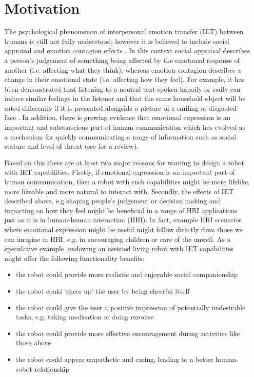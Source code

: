 \documentclass[11pt]{article}
\begin{document}
\section{Motivation}
The psychological phenomenon of interpersonal emotion transfer (IET) between humans is still not fully understood; however it is believed to include social appraisal and emotion contagion effects \cite{parkinson2011interpersonal}. In this context social appraisal describes a person's judgement of something being affected by the emotional response of another (i.e. affecting what they think), whereas emotion contagion describes a change in their emotional state (i.e. affecting how they feel). For example, it has been demonstrated that listening to a neutral text spoken happily or sadly can induce similar feelings in the listener \cite{neumann2000mood} and that the same household object will be rated differently if it is presented alongside a picture of a smiling or disgusted face \cite{bayliss2007affective}. In addition, there is growing evidence that emotional expression is an important and subconscious part of human communication which has evolved as a mechanism for quickly communicating a range of information such as social stature and level of threat (see \cite{tracy2015nonverbal} for a review). 

Based on this there are at least two major reasons for wanting to design a robot with IET capabilities. Firstly, if emotional expression is an important part of human communication, then a robot with such capabilities might be more lifelike, more likeable and more natural to interact with. Secondly, the effects of IET described above, e.g shaping people's judgement or decision making and impacting on how they feel might be beneficial in a range of HRI applications just as it is in human-human interaction (HHI). In fact, example HRI scenarios where emotional expression might be useful might follow directly from those we can imagine in HHI, e.g. in encouraging children or care of the unwell. As a speculative example, endowing an assisted living robot with IET  capabilities might offer the following functionality benefits: 
\begin{itemize}
\item the robot could provide more realistic and enjoyable social companionship
\item the robot could `cheer up' the user by being cheerful itself
\item the robot could give the user a positive impression of potentially undesirable tasks, e.g. taking medication or doing exercise
\item the robot could provide more effective encouragement during activities like those above
\item the robot could appear empathetic and caring, leading to a better human-robot relationship
\end{itemize}
\end{document}
